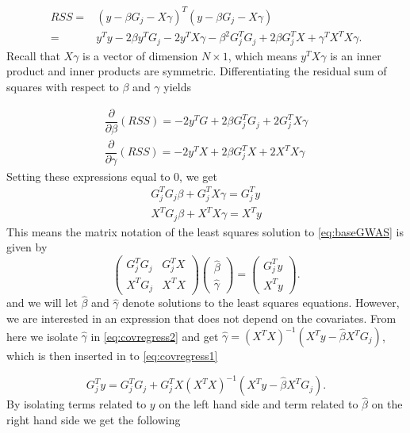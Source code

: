 \begin{align}
	RSS =& \left( y - \beta G_j - X\gamma \right)^T\left( y - \beta G_j - X\gamma \right) \\
	=& y^T y - 2\beta y^T G_j - 2y^TX\gamma - \beta^2 G_j^TG_j + 2\beta G_j^T X + \gamma^T X^T X \gamma.
\end{align}
Recall that $ X\gamma $ is a vector of dimension $ N \times 1 $, which means $ y^T X \gamma $ is an inner product and inner products are symmetric. Differentiating the residual sum of squares with respect to $ \beta $ and $ \gamma $ yields

\begin{align}
	\dfrac{\partial}{\partial \beta} (RSS) = -2y^TG + 2\beta G_j^TG_j + 2G_j^T X\gamma \\
	\dfrac{\partial}{\partial \gamma} (RSS)  = -2y^TX + 2\beta G^T_j X + 2X^TX\gamma 
\end{align}
Setting these expressions equal to $ 0 $, we get
\begin{align}
	G_j^T G_j \beta +  G_j^T X \gamma =  G_j^T y  \label{eq:covregress1}\\ 
	X^T G_j \beta + X^T X \gamma =  X^Ty \label{eq:covregress2}
\end{align}
This means the matrix notation of the least squares solution to \cref{eq:baseGWAS} is given by 
\begin{equation}
	\begin{pmatrix}
		G_j^T G_j & G_j^T X \\
		X^T G_j & X^T X
	\end{pmatrix}
	\begin{pmatrix}
		\hat{\beta} \\
		\hat{\gamma}
	\end{pmatrix} = 
	\begin{pmatrix}
		G_j^T y \\
		X^T y
	\end{pmatrix}.
\end{equation}
and we will let $ \hat{\beta} $ and $ \hat{\gamma} $ denote solutions to the least squares equations. However, we are interested in an expression that does not depend on the covariates. From here we isolate $ \hat{\gamma} $ in \cref{eq:covregress2} and get $ \hat{\gamma} = (X^TX)^{-1}(X^Ty - \hat{\beta} X^TG_j) $, which is then inserted in to \cref{eq:covregress1} 

\begin{equation}
	G^T_j y = G_j^TG_j + G_j^TX (X^TX)^{-1}(X^Ty - \hat{\beta} X^TG_j).
\end{equation}
By isolating terms related to $ y $ on the left hand side and term related to $ \hat{\beta} $ on the right hand side we get the following

